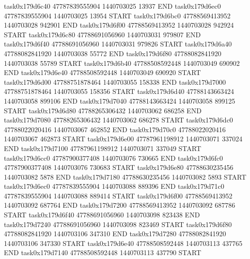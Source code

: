 task0x179d6c40 47787839555904          1440703025                13937  END
task0x179d6ec0 47787839555904          1440703025                13954  START
task0x179d6bc0 47788569413952          1440703028               942901  END
task0x179d6f00 47788569413952          1440703028               942924  START
task0x179d6c80 47788691056960          1440703031               979807  END
task0x179d6f40 47788691056960          1440703031               979826  START
task0x179d6a40 47788082841920          1440703038                55772  END
task0x179d6f80 47788082841920          1440703038                55789  START
task0x179d6b40 47788508592448          1440703049               690902  END
task0x179d6e40 47788508592448          1440703049               690920  START
task0x179d6d00 47788751878464          1440703055               158338  END
task0x179d7000 47788751878464          1440703055               158356  START
task0x179d6d40 47788143663424          1440703058               899106  END
task0x179d7040 47788143663424          1440703058               899125  START
task0x179d6d80 47788265306432          1440703062               686258  END
task0x179d7080 47788265306432          1440703062               686278  START
task0x179d6dc0 47788022020416          1440703067               462852  END
task0x179d70c0 47788022020416          1440703067               462873  START
task0x179d6e00 47787961198912          1440703071               337024  END
task0x179d7100 47787961198912          1440703071               337049  START
task0x179d6cc0 47787900377408          1440703076               730665  END
task0x179d6fc0 47787900377408          1440703076               730683  START
task0x179d6e80 47788630235456          1440703082                 5878  END
task0x179d7180 47788630235456          1440703082                 5893  START
task0x179d6ec0 47787839555904          1440703088               889396  END
task0x179d71c0 47787839555904          1440703088               889414  START
task0x179d6f00 47788569413952          1440703092               687764  END
task0x179d7200 47788569413952          1440703092               687786  START
task0x179d6f40 47788691056960          1440703098               823438  END
task0x179d7240 47788691056960          1440703098               823469  START
task0x179d6f80 47788082841920          1440703106               347310  END
task0x179d7280 47788082841920          1440703106               347330  START
task0x179d6e40 47788508592448          1440703113               437765  END
task0x179d7140 47788508592448          1440703113               437790  START
